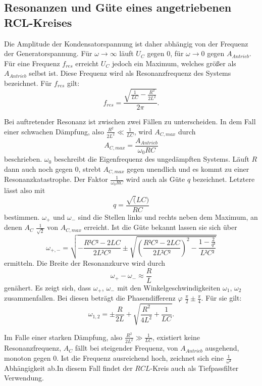 \subsection{Resonanzen und Güte eines angetriebenen RCL-Kreises}

Die Amplitude der Kondensatorspannung ist daher abhängig von der Frequenz der Generatorspannung.
Für $\omega \to \infty$ läuft $U_C$ gegen 0, für $\omega \to 0$ gegen $A_{Antrieb}$.
Für eine Frequenz $f_{res}$ erreicht $U_C$  jedoch ein Maximum, welches größer als $A_{Antrieb}$ selbst ist.
Diese Frequenz wird als Resonanzfrequenz des Systems bezeichnet. Für $f_{res}$ gilt:
\begin{equation}
  f_{res} = \frac{\sqrt{\frac{1}{LC}-\frac{R^2}{2L^2}}}{2 \pi}\text{.}
\end{equation}

Bei auftretender Resonanz ist zwischen zwei Fällen zu unterscheiden.
In dem Fall einer schwachen Dämpfung, also $\frac{R^2}{2L^2} \ll \frac{1}{LC}$, wird  $A_{C,max}$ durch
\begin{equation}
  A_{C,max} = \frac{A_{Antrieb}}{\omega_0 RC}
\end{equation}
beschrieben. $\omega_0$ beschreibt die Eigenfrequenz des ungedämpften Systems.
Läuft $R$ dann auch noch gegen 0, strebt $A_{C,max}$ gegen unendlich und es kommt zu einer
Resonanzkatastrophe.
 Der Faktor $\frac{1}{\omega_0 RC}$ wird auch als Güte $q$ bezeichnet.
Letztere lässt also mit
\begin{equation}
  q = \frac{\sqrt(LC)}{RC}
  \end{equation}
bestimmen. $\omega_+$ und $\omega_-$ sind die Stellen links und rechts neben dem Maximum,
 an denen $A_C$ $\frac{1}{\sqrt{2}}$ von $A_{C,max}$ erreicht.
 Ist die Güte bekannt lassen sie sich über
 \begin{equation}
   \omega_{+,-} = \sqrt{-\frac{R²C²-2LC}{2L²C²} \pm \sqrt{\left( \frac{R²C²-2LC}{2L²C²} \right) ^2 - \frac{1- \frac{2}{q²}}{L²C²}}}
 \end{equation}
 ermitteln.
 Die Breite der Resonanzkurve wird durch 
 \begin{equation}
   \omega_+ - \omega_- \approx \frac{R}{L}
 \end{equation}
 genähert. Es zeigt sich, dass $\omega_+$, $\omega_-$ mit den Winkelgeschwindigkeiten $\omega_1$, $\omega_2$ zusammenfallen.
  Bei diesen beträgt die Phasendifferenz $\varphi$ $\frac{\pi}{2}\pm \frac{\pi}{4}$. Für sie gilt:
\begin{equation}
  \omega_{1,2} = \pm \frac{R}{2L} + \sqrt{\frac{R^2}{4L^2} + \frac{1}{LC}}\text{.}
\end{equation}

 Im Falle einer starken Dämpfung, also $\frac{R^2}{2L^2} \gg \frac{1}{LC}$, existiert keine Resonanzfrequenz, $A_C$ fällt bei steigender Frequenz, von $A_{Antrieb}$ ausgehend, monoton gegen 0. Ist die Frequenz ausreichend hoch, zeichnet
  sich eine $\frac{1}{\omega²}$ Abhängigkeit ab.In diesem Fall findet der $RCL$-Kreis auch als Tiefpassfilter Verwendung.
